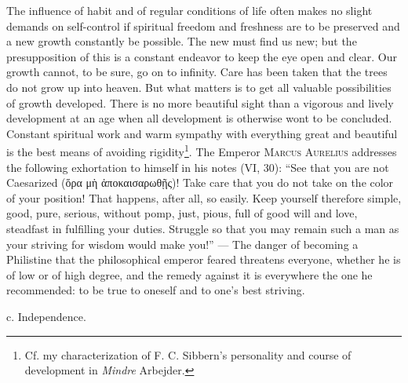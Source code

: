 \documentclass[12pt,a4paper,openany]{book}
\newcommand{\opage}[1]{\marginnote{\footnotesize\textit{[#1]}}}
\begin{document}
The influence of habit and of regular conditions of life often makes no slight demands on self-control if spiritual
freedom and freshness are to be preserved and a new growth constantly be possible. The new must find us new; but the
presupposition of this is a constant endeavor to keep the eye open and clear. Our growth cannot, to be sure, go on
to infinity. Care has been taken that the trees do not grow up into heaven. But what matters is to get all valuable
possibilities of growth developed. There is no more beautiful sight than a vigorous and lively development at an age
when all development is otherwise wont to be concluded. Constant spiritual work and warm sympathy with everything
great and beautiful is the best means of avoiding rigidity\footnote[1]{Cf. my characterization of F. C. Sibbern's
personality and course of development in \textit{Mindre} Arbejder.}. The Emperor \textsc{Marcus Aurelius} addresses
the following exhortation to himself in his notes (VI, 30): ``See that you are not Caesarized (ὅρα μὴ
ἀποκαισαρωθῇς)! Take care that you do not take on the color of your position! That happens, after all, so easily.
Keep yourself therefore simple, good, pure, serious, without pomp, just, pious, full of good will and love,
steadfast in fulfilling your duties. Struggle so that you may remain such a man as your striving for wisdom would
make you!'' --- The danger of becoming a Philistine that the philosophical emperor feared threatens everyone,
whether he is of low or of high degree, and the remedy against it is everywhere the one he recommended: to be true
to oneself and to one's best striving.

\begin{center}\opage{231}c. Independence.\end{center}
\end{document}
